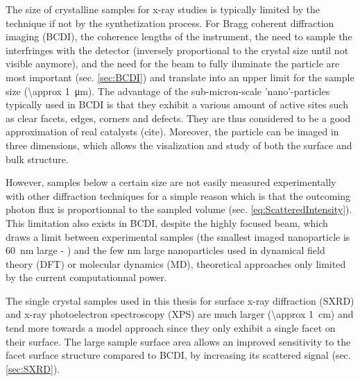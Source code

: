 The size of crystalline samples for x-ray studies is typically limited by the technique if not by the synthetization process.
For Bragg coherent diffraction imaging (BCDI), the coherence lengths of the instrument, the need to sample the interfringes with the detector (inversely proportional to the crystal size until not visible anymore), and the need for the beam to fully iluminate the particle are most important (sec. \ref{sec:BCDI}) and translate into an upper limit for the sample size (\qty{\approx 1}{\um}).
The advantage of the sub-micron-scale 'nano'-particles typically used in BCDI is that they exhibit a various amount of active sites such as clear facets, edges, corners and defects.
They are thus considered to be a good approximation of real catalysts (cite).
Moreover, the particle can be imaged in three dimensions, which allows the visalization and study of both the surface and bulk structure.

However, samples below a certain size are not easily measured experimentally with other diffraction techniques for a simple reason which is that the outcoming photon flux is proportionnal to the sampled volume (sec. \ref{eq:ScatteredIntensity}).
This limitation also exists in BCDI, despite the highly focused beam, which draws a limit between experimental samples (the smallest imaged nanoparticle is \qty{60}{\nm} large - \cite{Bjorling2019, Carnis2021}) and the few \unit{\nm} large nanoparticles used in dynamical field theory (DFT) or molecular dynamics (MD), theoretical approaches only limited by the current computationnal power.

The single crystal samples used in this thesis for surface x-ray diffraction (SXRD) and x-ray photoelectron spectroscopy (XPS) are much larger (\qty{\approx 1}{\cm}) and tend more towards a model approach since they only exhibit a single facet on their surface.
The large sample surface area allows an improved sensitivity to the facet surface structure compared to BCDI, by increasing its scattered signal (sec. \ref{sec:SXRD}).


